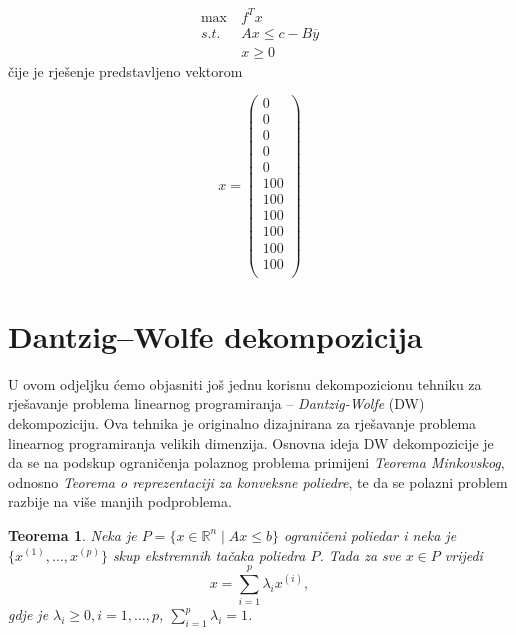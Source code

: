 \documentclass[b5paper, utf8, 11pt, colorlinks]{book}
\newtheorem{thm}{Teorema}[chapter]
\theoremstyle{definition}
\begin{document}
 \begin{equation}\label{primer:formulacija3}
	\begin{aligned}
		\max\  &f^Tx\\
		s.t.\  &Ax\leqslant c-B\overline{y}\\
		&x\geqslant 0
	\end{aligned}
\end{equation}
čije je rješenje predstavljeno vektorom

$$x =\left(\begin{array}{c}
	0\\
	0\\
	0\\
	0\\
	0\\
	100\\
	100\\
	100\\
	100\\
	100\\
	100\\
\end{array}\right)$$



  \section{Dantzig--Wolfe dekompozicija}%
 
 U ovom odjeljku ćemo objasniti još jednu korisnu dekompozicionu tehniku za rješavanje problema linearnog programiranja -- \emph{Dantzig-Wolfe} (DW) dekompoziciju. Ova tehnika je originalno dizajnirana za rješavanje problema linearnog programiranja velikih dimenzija. Osnovna ideja DW dekompozicije je da se na podskup ograničenja polaznog problema primijeni \emph{Teorema Minkovskog}, odnosno \emph{Teorema o reprezentaciji za konveksne poliedre}, te da se polazni problem razbije na   više manjih podproblema.
 
 \begin{thm}
 	Neka je $P = \{ x \in \mathbb{R}^n \mid Ax \leq b\}$ ograničeni poliedar i neka je $\{x^{(1)}, \ldots, x^{(p)} \}$ skup ekstremnih tačaka poliedra $P$. Tada za sve $x \in P$ vrijedi 
 	 $$ x = \sum_{i=1}^p \lambda_i x^{(i)},$$ 
 	 gdje je $\lambda_i \geq 0,i=1,\ldots,p$, $\sum_{i=1}^p \lambda_i=1$.
 \end{thm}
 
\end{document}
